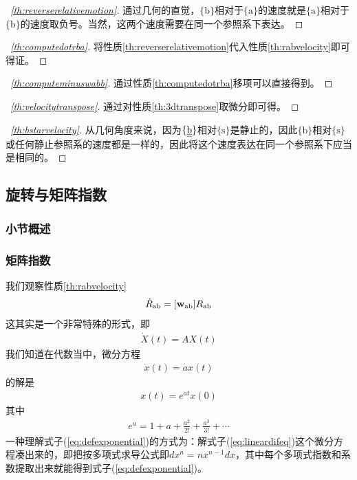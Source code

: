 \documentclass[12pt, a4paper, article, UTF8]{ctexart}
\begin{document}
\begin{proof}[\proofname\ \ref{th:reverserelativemotion}]
通过几何的直觉，$\{\text{b}\}$相对于$\{\text{a}\}$的速度就是$\{\text{a}\}$相对于$\{\text{b}\}$的速度取负号。当然，这两个速度需要在同一个参照系下表达。
\end{proof}

\begin{proof}[\proofname\ \ref{th:computedotrba}]
将性质\ref{th:reverserelativemotion}代入性质\ref{th:rabvelocity}即可得证。
\end{proof}

\begin{proof}[\proofname\ \ref{th:computeminuswabb}]
通过性质\ref{th:computedotrba}移项可以直接得到。
\end{proof}

\begin{proof}[\proofname\ \ref{th:velocitytranspose}]
通过对性质\ref{th:3dtranspose}取微分即可得。
\end{proof}

\begin{proof}[\proofname\ \ref{th:bstarvelocity}]
从几何角度来说，因为$\{\text{\underline{\underline{b}}}\}$相对$\{\text{s}\}$是静止的，因此$\{\text{b}\}$相对$\{\text{s}\}$或任何静止参照系的速度都是一样的，因此将这个速度表达在同一个参照系下应当是相同的。
\end{proof}



\subsection{旋转与矩阵指数}
\subsubsection{小节概述}
\subsubsection{矩阵指数}
我们观察性质\ref{th:rabvelocity}
\begin{align*}
\dot{R}_\textnormal{ab} = [\mathbf{w}_\textnormal{ab}]R_\textnormal{ab}
\end{align*}
这其实是一个非常特殊的形式，即
\begin{align}
\dot{X}(t) = AX(t)
\end{align}
我们知道在代数当中，微分方程
\begin{align}
\dot{x}(t) = ax(t)
\end{align}
的解是
\begin{align}
x(t) = e^{at}x(0) \label{eq:lineardifeq}
\end{align}
其中
\begin{align}
e^{a} = 1 + a + \frac{a^2}{2!} + \frac{a^3}{3!} + \cdots \label{eq:defexponential}
\end{align}
一种理解式子(\ref{eq:defexponential})的方式为：解式子(\ref{eq:lineardifeq})这个微分方程凑出来的，即把按多项式求导公式即$dx^n=nx^{n-1}dx$，其中每个多项式指数和系数提取出来就能得到式子(\ref{eq:defexponential})。
\end{document}
